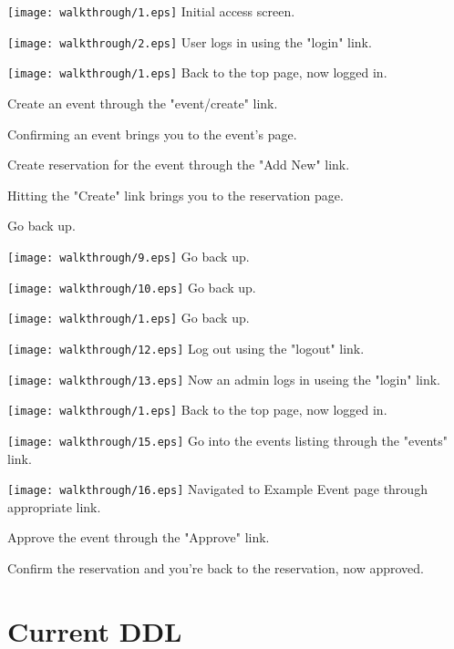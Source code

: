 \documentclass{article}
\begin{document}
\texttt{[image: walkthrough/1.eps]}
{\center Initial access screen.}

\texttt{[image: walkthrough/2.eps]}
{\center User logs in using the "login" link.}

\texttt{[image: walkthrough/1.eps]}
{\center Back to the top page, now logged in.}

{\center Create an event through the "event/create" link.}

{\center Confirming an event brings you to the event's page.}

{\center Create reservation for the event through the "Add New" link.}

{\center Hitting the "Create" link brings you to the reservation page.}

{\center Go back up.}

\texttt{[image: walkthrough/9.eps]}
{\center Go back up.}

\texttt{[image: walkthrough/10.eps]}
{\center Go back up.}

\texttt{[image: walkthrough/1.eps]}
{\center Go back up.}

\texttt{[image: walkthrough/12.eps]}
{\center Log out using the "logout" link.}

\texttt{[image: walkthrough/13.eps]}
{\center Now an admin logs in useing the "login" link.}

\texttt{[image: walkthrough/1.eps]}
{\center Back to the top page, now logged in.}

\texttt{[image: walkthrough/15.eps]}
{\center Go into the events listing through the "events" link.}

\texttt{[image: walkthrough/16.eps]}
{\center Navigated to Example Event page through appropriate link.}

{\center Approve the event through the "Approve" link.}

{\center Confirm the reservation and you're back to the reservation, now approved.}

\section{Current DDL}

\end{document}
